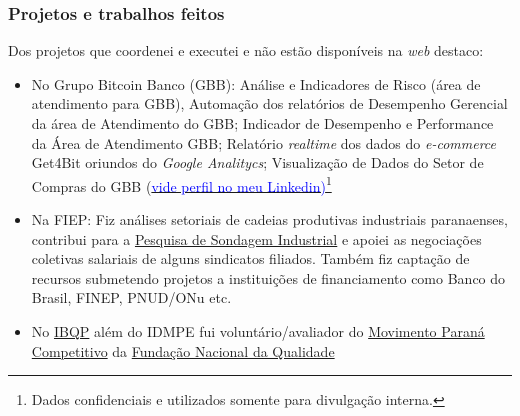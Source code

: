 \documentclass{beamer}
\begin{document}
\begin{frame}
\frametitle{Projetos e trabalhos feitos}

\footnotesize
Dos projetos que coordenei e executei e não estão disponíveis na \textit{web} destaco:
\begin{itemize}
    \item<1-3> No Grupo Bitcoin Banco (GBB): Análise e Indicadores de Risco (área de atendimento para GBB), Automação dos relatórios de Desempenho Gerencial da área de Atendimento do GBB; Indicador de Desempenho e Performance da Área de Atendimento GBB; Relatório \textit{realtime} dos dados do \textit{e-commerce} Get4Bit oriundos do \textit{Google Analitycs}; Visualização de Dados do Setor de Compras do GBB (\href{https://www.linkedin.com/in/rodrigohermontozon/}{\textcolor{blue}{vide perfil no meu Linkedin)}}\footnote{\tiny Dados confidenciais e utilizados somente para divulgação interna.}
    \item<2-3> Na FIEP: Fiz análises setoriais de cadeias produtivas industriais paranaenses, contribui para a \textcolor{blue}{\href{http://www.fiepr.org.br/para-empresas/estudos-economicos/sondagem-industrial-1-20654-238938.shtml}{Pesquisa de Sondagem Industrial}} e apoiei as negociações coletivas salariais de alguns sindicatos filiados. Também fiz captação de recursos submetendo projetos a instituições de financiamento como Banco do Brasil, FINEP, PNUD/ONu etc.
    \item<3-3> No \textcolor{blue}{\href{http://ibqp.org.br/}{IBQP}} além do IDMPE fui voluntário/avaliador do \textcolor{blue}{\href{http://www.ibqp.org.br/projetos/movimento-parana-competitivo/sobre-mpc/}{Movimento Paraná Competitivo}} da \textcolor{blue}{\href{http://www.fnq.org.br/}{Fundação Nacional da Qualidade}} 
\end{itemize}



\end{frame}
\end{document}
